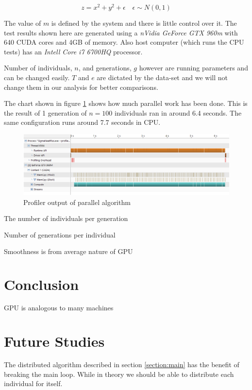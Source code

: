 \documentclass[twocolumn]{article}
\begin{document}
\begin{equation}
    \label{eq:ExpectedOutput}
    z=x^2+y^2+\epsilon \quad \epsilon \sim N(0,1)
\end{equation}

The value of $m$ is defined by the system and there is little control over it. The test results shown here are generated using a \textit{nVidia GeForce GTX 960m} with 640 CUDA cores and 4GB of memory. Also host computer (which runs the CPU tests) has an \textit{Intell Core i7 6700HQ} processor.

Number of individuals, $n$, and generations, $g$ however are running parameters and can be changed easily. $T$ and $e$ are dictated by the data-set and we will not change them in our analysis for better comparisons.

The chart shown in figure \ref{img:profiler} shows how much parallel work has been done. This is the result of 1 generation of $n=100$ individuals ran in around 6.4 seconds. The same configuration runs around 7.7 seconds in CPU.

\begin{figure}
    \centering \includegraphics[width=\textwidth]{ProfiledSingleGenerationOf100}    
    \caption{Profiler output of parallel algorithm}
    \label{img:profiler}
\end{figure}

The number of individuals per generation

Number of generations per individual

Smoothness is from average nature of GPU


\section{Conclusion}

GPU is analogous to many machines


\section{Future Studies}
The distributed algorithm described in section \ref{section:main} has the benefit of breaking the main loop. While in theory we should be able to distribute each individual for itself.
\end{document}
